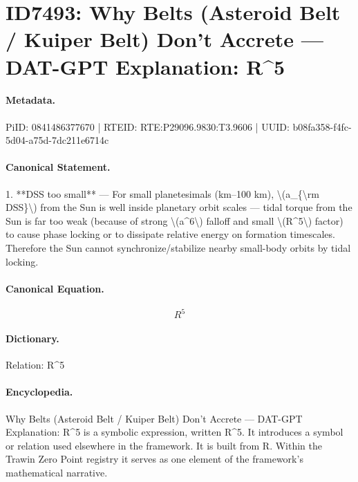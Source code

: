 \section*{ID7493: Why Belts (Asteroid Belt / Kuiper Belt) Don’t Accrete — DAT-GPT Explanation: R\textasciicircum{}5}
\paragraph{Metadata.}
PiID: 0841486377670 | RTEID: RTE:P29096.9830:T3.9606 | UUID: b08fa358-f4fc-5d04-a75d-7dc211e6714c

\paragraph{Canonical Statement.}
1. **DSS too small** — For small planetesimals (km–100 km), \textbackslash{}(a\_\{\textbackslash{}rm DSS\}\textbackslash{}) from the Sun is well inside planetary orbit scales — tidal torque from the Sun is far too weak (because of strong \textbackslash{}(a\textasciicircum{}6\textbackslash{}) falloff and small \textbackslash{}(R\textasciicircum{}5\textbackslash{}) factor) to cause phase locking or to dissipate relative energy on formation timescales. Therefore the Sun cannot synchronize/stabilize nearby small-body orbits by tidal locking.

\paragraph{Canonical Equation.}
\[
R^5
\]

\paragraph{Dictionary.}
Relation: R\textasciicircum{}5

\paragraph{Encyclopedia.}
Why Belts (Asteroid Belt / Kuiper Belt) Don’t Accrete — DAT-GPT Explanation: R\textasciicircum{}5 is a symbolic expression, written R\textasciicircum{}5. It introduces a symbol or relation used elsewhere in the framework. It is built from R. Within the Trawin Zero Point registry it serves as one element of the framework's mathematical narrative.
